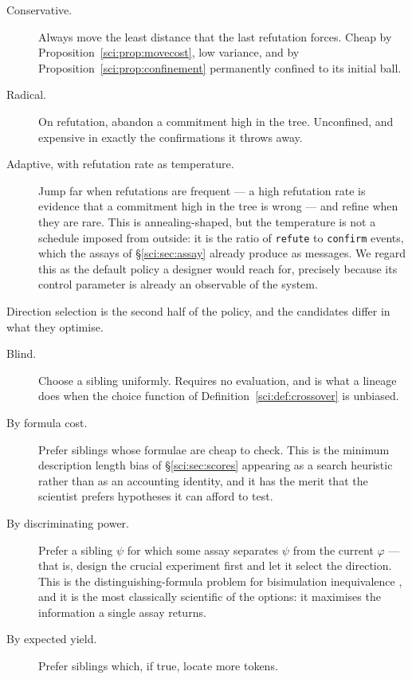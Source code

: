 \begin{description}
\item[Conservative.] Always move the least distance that the last refutation forces. Cheap by
Proposition~\ref{sci:prop:movecost}, low variance, and by Proposition~\ref{sci:prop:confinement} permanently
confined to its initial ball.

\item[Radical.] On refutation, abandon a commitment high in the tree. Unconfined, and expensive in
exactly the confirmations it throws away.

\item[Adaptive, with refutation rate as temperature.] Jump far when refutations are frequent --- a
high refutation rate is evidence that a commitment high in the tree is wrong --- and refine when they
are rare. This is annealing-shaped, but the temperature is not a schedule imposed from outside: it is
the ratio of \texttt{refute} to \texttt{confirm} events, which the assays of \S\ref{sci:sec:assay} already
produce as messages. We regard this as the default policy a designer would reach for, precisely
because its control parameter is already an observable of the system.
\end{description}

Direction selection is the second half of the policy, and the candidates differ in what they optimise.

\begin{description}
\item[Blind.] Choose a sibling uniformly. Requires no evaluation, and is what a lineage does when the
choice function of Definition~\ref{sci:def:crossover} is unbiased.

\item[By formula cost.] Prefer siblings whose formulae are cheap to check. This is the minimum
description length bias of \S\ref{sci:sec:scores} appearing as a search heuristic rather than as an
accounting identity, and it has the merit that the scientist prefers hypotheses it can afford to test.

\item[By discriminating power.] Prefer a sibling $\psi$ for which some assay separates $\psi$ from the
current $\varphi$ --- that is, design the crucial experiment first and let it select the direction.
This is the distinguishing-formula problem for bisimulation inequivalence \cite{Cleaveland}, and it is
the most classically scientific of the options: it maximises the information a single assay returns.

\item[By expected yield.] Prefer siblings which, if true, locate more tokens.
\end{description}

